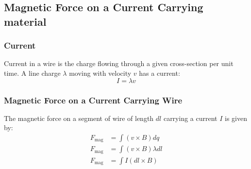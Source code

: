 \documentclass{article}
\begin{document}
\subsection{Magnetic Force on a Current Carrying material}
\subsubsection*{Current}
Current in a wire is the charge flowing through a given cross-section per unit time.
A line charge $\lambda$ moving with velocity $v$ has a current:
\[ I = \lambda v \]

\subsubsection*{Magnetic Force on a Current Carrying Wire}
The magnetic force on a segment of wire of length $dl$ carrying a current $I$ is given by:
\begin{align*}
    F_{\text{mag}} &= \int (v \times B) dq\\
    F_{\text{mag}} &= \int (v \times B) \lambda dl\\
    F_{\text{mag}} &= \int I (dl \times B)
\end{align*}
\end{document}
